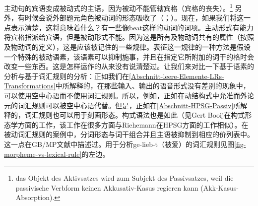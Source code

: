 \ex 主动句的宾语变成被动式的主语，因为被动不能管辖宾格（宾格的丧失）。\footnote{%
das Objekt des Aktivsatzes wird zum Subjekt des Passivsatzes, weil die passivische Verbform
keinen Akkusativ-Kasus regieren kann (Akk-Kasus-Absorption).}\citep[]{Lohnstein2014a} 
\zl
另外，有时候会说外部题元角色被动词的形态吸收了（\citealp{Jaeggli86a}；\citealp[]{Haegeman94a-u}）。现在，如果我们将这一点表示清楚，这将意味着什么？有一些像beat这样的动词的词项。主动形式有能力将宾格指派给宾语，但是被动形式不能。因为这是所有及物动词共有的属性（按照及物动词的定义），这是应该被记住的一些规律。表征这一规律的一种方法是假设一个特殊的被动语素，该语素可以抑制施事，并且在指定它所附加的词干的格时会改变一些东西。这是怎样运作的从来没有说清楚过。让我们来对比一下基于语素的分析与基于词汇规则的分析：正如我们在\ref{Abschnitt-leere-Elemente-LRs-Transformations}中所解释的，在那些输入、输出的语音形式没有差别的现象中，可以使用空中心语而不使用词汇规则。所以，例如，正如在动结构式中允准而外论元的词汇规则可以被空中心语代替。但是，正如在\ref{Abschnitt-HPSG-Passiv}所解释的，词汇规则也可以用于刻画形态。构式语法\indexcxg 也是如此（见Gert Booij\citeyearpar{Booij2010a}在构式形态学方面的工作，该工作在很多方面与Riehemann在HPSG方面的工作相似\citeyearpar{Riehemann93a,Riehemann98a}）。在被动词汇规则的案例中，分词形态与词干组合并且主语被抑制到相应的价列表中。这一点在GB/MP文献中描述过。用于分析ge-lieb-t（被爱）的词汇规则见图\vref{fig-morpheme-vs-lexical-rule}的左边。

